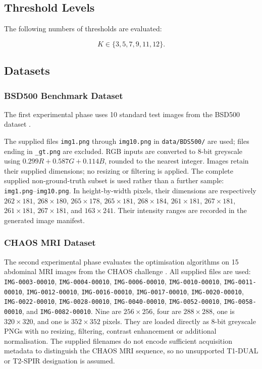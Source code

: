 \documentclass[review]{elsarticle}
\begin{document}
\subsection{Threshold Levels}

The following numbers of thresholds are evaluated:

\begin{equation}
K \in \{3,5,7,9,11,12\}.
\end{equation}


\subsection{Datasets}


\subsubsection{BSD500 Benchmark Dataset}

The first experimental phase uses 10 standard test images from the
BSD500 dataset \citep{arbelaez2011contour}.

The supplied files \texttt{img1.png} through \texttt{img10.png} in
\texttt{data/BDS500/} are used; files ending in \texttt{\_gt.png} are
excluded. RGB inputs are converted to 8-bit greyscale using
$0.299R+0.587G+0.114B$, rounded to the nearest integer. Images retain their
supplied dimensions; no resizing or filtering is applied.
The complete supplied non-ground-truth subset is used rather than a further
sample: \texttt{img1.png}--\texttt{img10.png}. In height-by-width pixels,
their dimensions are respectively $262\times181$, $268\times180$,
$265\times178$, $265\times181$, $268\times184$, $261\times181$,
$267\times181$, $261\times181$, $267\times181$, and $163\times241$.
Their intensity ranges are recorded in the generated image manifest.


\subsubsection{CHAOS MRI Dataset}

The second experimental phase evaluates the optimisation algorithms on
15 abdominal MRI images from the CHAOS challenge
\citep{kavur2021chaos}. All supplied files are used:
\texttt{IMG-0003-00010}, \texttt{IMG-0004-00010},
\texttt{IMG-0006-00010}, \texttt{IMG-0010-00010},
\texttt{IMG-0011-00010}, \texttt{IMG-0012-00010},
\texttt{IMG-0016-00010}, \texttt{IMG-0017-00010},
\texttt{IMG-0020-00010}, \texttt{IMG-0022-00010},
\texttt{IMG-0028-00010}, \texttt{IMG-0040-00010},
\texttt{IMG-0052-00010}, \texttt{IMG-0058-00010}, and
\texttt{IMG-0082-00010}. Nine are $256\times256$, four are
$288\times288$, one is $320\times320$, and one is $352\times352$ pixels.
They are loaded directly as 8-bit greyscale PNGs with no resizing, filtering,
contrast enhancement or additional normalisation. The supplied filenames do
not encode sufficient acquisition metadata to distinguish the CHAOS MRI
sequence, so no unsupported T1-DUAL or T2-SPIR designation is assumed.
\end{document}
